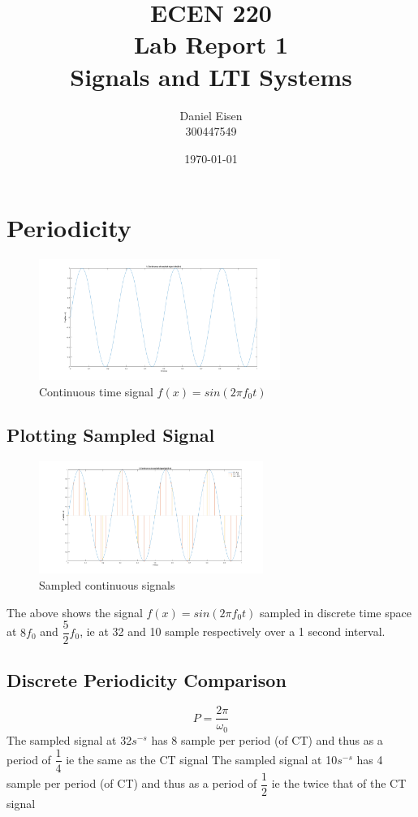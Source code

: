 \documentclass[a4paper,11pt]{article}
\title{ECEN 220 \\ Lab Report 1 \\ Signals and LTI Systems}
\author{Daniel Eisen \\ 300447549}
\date{\today}
\begin{document}
	\maketitle
	\tableofcontents
	\newpage
	\section{Periodicity}
		\begin{figure}[h]
		 \begin{center}
		  \includegraphics[width=0.7\textwidth]{1a}
		  \caption{Continuous time signal $f(x) = sin(2{\pi}f_{0}t)$}
		 \end{center}
		\end{figure}
		\subsection{Plotting Sampled Signal}
			\begin{figure}[h]
			 \begin{center}
			  \includegraphics[width=0.65\textwidth]{1b}
			  \caption{Sampled continuous signals}
			 \end{center}
			\end{figure}
			The above shows the signal $f(x) = sin(2{\pi}f_{0}t)$ sampled in discrete time space at $8f_{0}$ and $\dfrac{5}{2}f_{0}$, ie at 32 and 10 sample respectively over a 1 second interval.
		\subsection{Discrete Periodicity Comparison}
		$$P = \dfrac{2 \pi}{\omega_{0}}$$
		The sampled signal at 32$s^{-s}$ has 8 sample per period (of CT) and thus as a period of $\dfrac{1}{4}$ ie the same as the CT signal
		The sampled signal at 10$s^{-s}$ has 4 sample per period (of CT) and thus as a period of $\dfrac{1}{2}$ ie the twice that of the CT signal
\newpage
\end{document}
